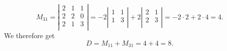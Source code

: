 \[ 
M_{31} = \left| \begin{array}{ccc}
2 & 1 & 1\\
2 & 2 & 0\\
2 & 1 & 3\\
\end{array} \right| = - 2 \left| \begin{array}{cc}
1 & 1\\
1 & 3\\
\end{array} \right| + 2 \left| \begin{array}{cc}
2 & 1\\
2 & 3\\
\end{array} \right| = -2 \cdot 2 + 2 \cdot 4 = 4
.\]
We therefore get
\[ 
D = M_{11} + M_{31} = 4 + 4 = 8
.\]



